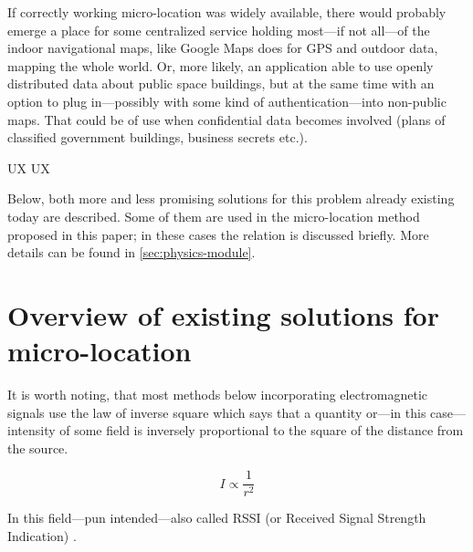 If correctly working micro-location was widely available, there would probably emerge a place for some centralized service holding most---if not all---of the indoor navigational maps, like Google Maps does for GPS and outdoor data, mapping the whole world. Or, more likely, an application able to use openly distributed data about public space buildings, but at the same time with an option to plug in---possibly with some kind of authentication---into non-public maps. That could be of use when confidential data becomes involved (plans of classified government buildings, business secrets etc.).

UX UX 

Below, both more and less promising solutions for this problem already existing today are described. Some of them are used in the micro-location method proposed in this paper; in these cases the relation is discussed briefly. More details can be found in \cref{sec:physics-module}.

\section{Overview of existing solutions for micro-location}
\label{sec:existing-uloc}

It is worth noting, that most methods below incorporating electromagnetic signals use the law of inverse square which says that a quantity or---in this case---intensity of some field is inversely proportional to the square of the distance from the source.

\begin{equation}
	\label{eq:inverse-sq}
	I \propto \frac{1}{r^2}
\end{equation}

In this field---pun intended---also called RSSI (or Received Signal Strength Indication) \cite{Gough:RSSI}.

